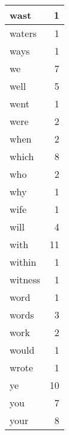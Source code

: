 \begin{center}
\begin{longtable}{l|r}
wast & 1 \\ \hline
waters & 1 \\ \hline
ways & 1 \\ \hline
we & 7 \\ \hline
well & 5 \\ \hline
went & 1 \\ \hline
were & 2 \\ \hline
when & 2 \\ \hline
which & 8 \\ \hline
who & 2 \\ \hline
why & 1 \\ \hline
wife & 1 \\ \hline
will & 4 \\ \hline
with & 11 \\ \hline
within & 1 \\ \hline
witness & 1 \\ \hline
word & 1 \\ \hline
words & 3 \\ \hline
work & 2 \\ \hline
would & 1 \\ \hline
wrote & 1 \\ \hline
ye & 10 \\ \hline
you & 7 \\ \hline
your & 8 \\ \hline
\end{longtable}
\end{center}



\normalsize



